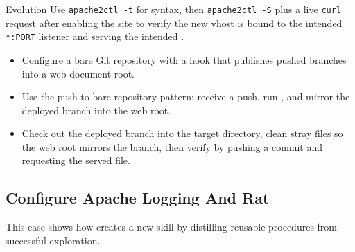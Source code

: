 \begin{svpromptbox}{Evolution}
\svpartsep
{}
Use \texttt{apache2ctl -t} for syntax, then \texttt{apache2ctl -S} plus a live \texttt{curl} request after enabling the site to verify the new vhost is bound to the intended \texttt{*:PORT} listener and serving the intended .

\begin{itemize}
    \item Configure a bare Git repository with a  hook that publishes pushed branches into a web document root.
    \item Use the push-to-bare-repository pattern: receive a push, run , and mirror the deployed branch into the web root.
    \item Check out the deployed branch into the target directory, clean stray files so the web root mirrors the branch, then verify by pushing a commit and requesting the served file.
\end{itemize}

\end{svpromptbox}

\subsection{Configure Apache Logging And Rat}
\label{app:case-apache-logging-rat}

\noindent This case shows how \ours creates a new skill by distilling reusable procedures from successful exploration.\par\medskip

